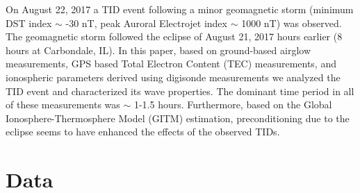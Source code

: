
On August 22, 2017 a TID event following a minor geomagnetic storm (minimum DST index $\sim$ -30 nT, peak Auroral Electrojet index $\sim$ 1000 nT) was observed. The geomagnetic storm followed the eclipse of August 21, 2017 hours earlier (8 hours at Carbondale, IL). In this paper, based on ground-based airglow measurements, GPS based Total Electron Content (TEC) measurements, and ionospheric parameters derived using digisonde measurements we analyzed the TID event and characterized its wave properties. The dominant time period in all of these measurements was $\sim$ 1-1.5 hours. Furthermore, based on the Global Ionosphere-Thermosphere Model (GITM) estimation, preconditioning due to the eclipse seems to have enhanced the effects of the observed TIDs.
\section{Data}
